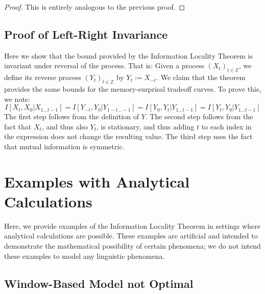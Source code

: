 \documentclass[11pt,letterpaper]{article}
\newcounter{theorem}
\begin{document}
\begin{proof}
This is entirely analogous to the previous proof.
\end{proof}


\subsection{Proof of Left-Right Invariance}

Here we show that the bound provided by the Information Locality Theorem is invariant under reversal of the process.
That is: Given a process $(X_t)_{t \in \mathbb{Z}}$, we define its reverse process $(Y_t)_{t \in \mathbb{Z}}$ by $Y_t := X_{-t}$.
We claim that the theorem provides the same bounds for the memory-surprisal tradeoff curves.
To prove this, we note:
\begin{equation}
	I[X_t, X_0|X_{1\dots t-1}] = I[Y_{-t}, Y_0|Y_{1-t\dots -1}] = I[Y_0, Y_t|Y_{1\dots t-1}] = I[Y_t, Y_0|Y_{1\dots t-1}]
\end{equation}
The first step follows from the definition of $Y$. The second step follows from the fact that $X_t$, and thus also $Y_t$, is stationary, and thus adding $t$ to each index in the expression does not change the resulting value. The third step uses the fact that mutual information is symmetric.


\section{Examples with Analytical Calculations}

Here, we provide examples of the Information Locality Theorem in settings where analytical calculations are possible.
These examples are artificial and intended to demonstrate the mathematical possibility of certain phenomena; we do not intend these examples to model any linguistic phenomena.


%
%

\subsection{Window-Based Model not Optimal}
\end{document}
